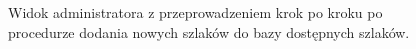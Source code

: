 \begin{figure}[H]
    \centering
    \caption{Widok administratora z przeprowadzeniem krok po kroku po procedurze dodania nowych szlaków do bazy dostępnych szlaków.}
    \label{widok:kml}
\end{figure}








